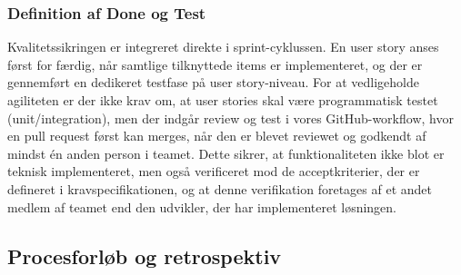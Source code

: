 \subsubsection{Definition af Done og Test}
Kvalitetssikringen er integreret direkte i sprint-cyklussen. 
En user story anses først for færdig, når samtlige tilknyttede items er implementeret, og der er gennemført en dedikeret testfase på user story-niveau.
For at vedligeholde agiliteten er der ikke krav om, at user stories skal være programmatisk testet (unit/integration), men der indgår review og test i vores GitHub-workflow, hvor en pull request først kan merges, når den er blevet reviewet og godkendt af mindst én anden person i teamet.
Dette sikrer, at funktionaliteten ikke blot er teknisk implementeret, men også verificeret mod de acceptkriterier, der er defineret i kravspecifikationen, og at denne verifikation foretages af et andet medlem af teamet end den udvikler, der har implementeret løsningen.

\subsection{Procesforløb og retrospektiv}
